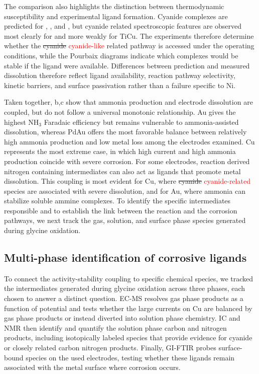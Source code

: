 \documentclass[twoside,twocolumn,9pt]{article}
\begin{document}
The comparison also highlights the distinction between thermodynamic susceptibility and experimental ligand formation. Cyanide complexes are predicted for , , and , but cyanide related spectroscopic features are observed most clearly for  and more weakly for TiCu. The experiments therefore determine whether the \sout{cyanide} \textcolor{red}{cyanide-like} related pathway is accessed under the operating conditions, while the Pourbaix diagrams indicate which complexes would be stable if the ligand were available. Differences between prediction and measured dissolution therefore reflect ligand availability, reaction pathway selectivity, kinetic barriers, and surface passivation rather than a failure specific to Ni.


Taken together, b,c show that ammonia production and electrode dissolution are coupled, but do not follow a universal monotonic relationship. Au gives the highest NH$_3$ Faradaic efficiency but remains vulnerable to ammonia-assisted dissolution, whereas PdAu offers the most favorable balance between relatively high ammonia production and low metal loss among the electrodes examined. Cu represents the most extreme case, in which high current and high ammonia production coincide with severe corrosion. For some electrodes, reaction derived nitrogen containing intermediates can also act as ligands that promote metal dissolution. This coupling is most evident for Cu, where \sout{cyanide} \textcolor{red}{cyanide-related} species are associated with severe dissolution, and for Au, where ammonia can stabilize soluble ammine complexes. To identify the specific intermediates responsible and to establish the link between the reaction and the corrosion pathways, we next track the gas, solution, and surface phase species generated during glycine oxidation.


\subsection{Multi-phase identification of corrosive ligands}
\label{sec:intermediates}

To connect the activity-stability coupling to specific chemical species, we tracked the intermediates generated during glycine oxidation across three phases, each chosen to answer a distinct question. EC-MS resolves gas phase products as a function of potential and tests whether the large currents on Cu are balanced by gas phase products or instead diverted into solution phase chemistry. IC and NMR then identify and quantify the solution phase carbon and nitrogen products, including isotopically labeled species that provide evidence for cyanide or closely related carbon nitrogen products. Finally, GI-FTIR probes surface-bound species on the used electrodes, testing whether these ligands remain associated with the metal surface where corrosion occurs.
\end{document}
